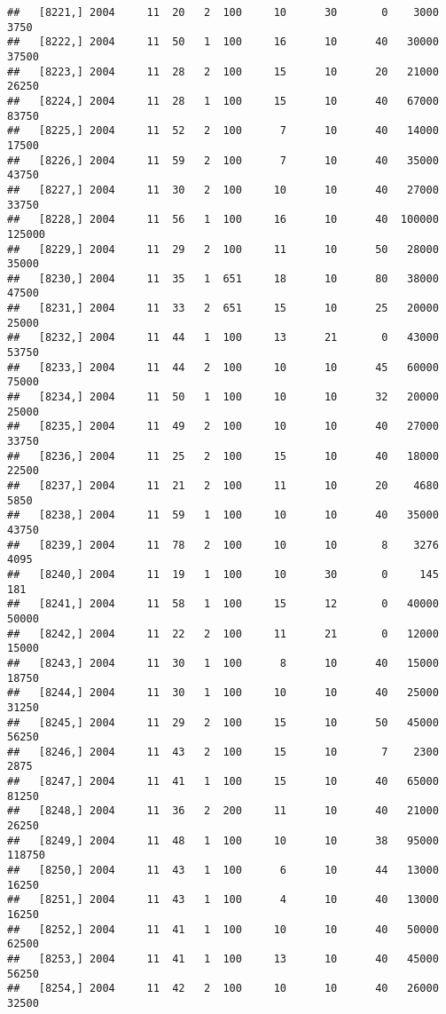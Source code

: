 \documentclass{article}\usepackage[]{graphicx}\usepackage[]{color}
\makeatletter
\newenvironment{kframe}{%
 \def\at@end@of@kframe{}%
 \ifinner\ifhmode%
  \def\at@end@of@kframe{\end{minipage}}%
  \begin{minipage}{\columnwidth}%
 \fi\fi%
 \def\FrameCommand##1{\hskip\@totalleftmargin \hskip-\fboxsep
 \colorbox{shadecolor}{##1}\hskip-\fboxsep
     \hskip-\linewidth \hskip-\@totalleftmargin \hskip\columnwidth}%
 \MakeFramed {\advance\hsize-\width
   \@totalleftmargin\z@ \linewidth\hsize
   \@setminipage}}%
 {\par\unskip\endMakeFramed%
 \at@end@of@kframe}
\newenvironment{knitrout}{}{} %
\makeatother
\begin{document}
\begin{knitrout}
\begin{kframe}
\begin{verbatim}
##   [8221,] 2004     11  20   2  100     10      30       0    3000    3750
##   [8222,] 2004     11  50   1  100     16      10      40   30000   37500
##   [8223,] 2004     11  28   2  100     15      10      20   21000   26250
##   [8224,] 2004     11  28   1  100     15      10      40   67000   83750
##   [8225,] 2004     11  52   2  100      7      10      40   14000   17500
##   [8226,] 2004     11  59   2  100      7      10      40   35000   43750
##   [8227,] 2004     11  30   2  100     10      10      40   27000   33750
##   [8228,] 2004     11  56   1  100     16      10      40  100000  125000
##   [8229,] 2004     11  29   2  100     11      10      50   28000   35000
##   [8230,] 2004     11  35   1  651     18      10      80   38000   47500
##   [8231,] 2004     11  33   2  651     15      10      25   20000   25000
##   [8232,] 2004     11  44   1  100     13      21       0   43000   53750
##   [8233,] 2004     11  44   2  100     10      10      45   60000   75000
##   [8234,] 2004     11  50   1  100     10      10      32   20000   25000
##   [8235,] 2004     11  49   2  100     10      10      40   27000   33750
##   [8236,] 2004     11  25   2  100     15      10      40   18000   22500
##   [8237,] 2004     11  21   2  100     11      10      20    4680    5850
##   [8238,] 2004     11  59   1  100     10      10      40   35000   43750
##   [8239,] 2004     11  78   2  100     10      10       8    3276    4095
##   [8240,] 2004     11  19   1  100     10      30       0     145     181
##   [8241,] 2004     11  58   1  100     15      12       0   40000   50000
##   [8242,] 2004     11  22   2  100     11      21       0   12000   15000
##   [8243,] 2004     11  30   1  100      8      10      40   15000   18750
##   [8244,] 2004     11  30   1  100     10      10      40   25000   31250
##   [8245,] 2004     11  29   2  100     15      10      50   45000   56250
##   [8246,] 2004     11  43   2  100     15      10       7    2300    2875
##   [8247,] 2004     11  41   1  100     15      10      40   65000   81250
##   [8248,] 2004     11  36   2  200     11      10      40   21000   26250
##   [8249,] 2004     11  48   1  100     10      10      38   95000  118750
##   [8250,] 2004     11  43   1  100      6      10      44   13000   16250
##   [8251,] 2004     11  43   1  100      4      10      40   13000   16250
##   [8252,] 2004     11  41   1  100     10      10      40   50000   62500
##   [8253,] 2004     11  41   1  100     13      10      40   45000   56250
##   [8254,] 2004     11  42   2  100     10      10      40   26000   32500

\end{verbatim}
\end{kframe}
\end{knitrout}
\end{document}
